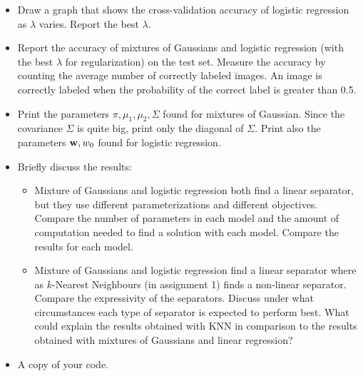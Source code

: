 \documentclass{article}
\begin{document}
\begin{enumerate}
\begin{itemize}
\item Draw a graph that shows the cross-validation accuracy of logistic regression as $\lambda$ varies.  Report the best $\lambda$. 
\item Report the accuracy of mixtures of Gaussians and logistic
  regression (with the best $\lambda$ for regularization) on the test set.  Measure the accuracy by counting the average number of
  correctly labeled images.  An image is correctly labeled when the probability of
  the correct label is greater than 0.5.  
\item Print the parameters $\pi, \mu_1, \mu_2, \Sigma$ found for mixtures of Gaussian.  Since the covariance $\Sigma$ is quite big, print only the diagonal of $\Sigma$.  Print also the parameters ${\bf w}, w_0$ found for logistic regression.
\item Briefly discuss the results: 
\begin{itemize}
\item Mixture of Gaussians and logistic regression both find a linear separator, but they use different parameterizations and different objectives.  Compare the number of parameters in each model and the amount of computation needed to find a solution with each model.  Compare the results for each model.
\item Mixture of Gaussians and logistic regression find a linear separator where as $k$-Nearest Neighbours (in assignment 1) finds a non-linear separator.  Compare the expressivity of the separators.  Discuss under what circumstances each type of separator is expected to perform best.  What could explain the results obtained with KNN in comparison to the results obtained with mixtures of Gaussians and linear regression?
\end{itemize}
\item A copy of your code. 
\end{itemize}



\end{enumerate}
\end{document}
